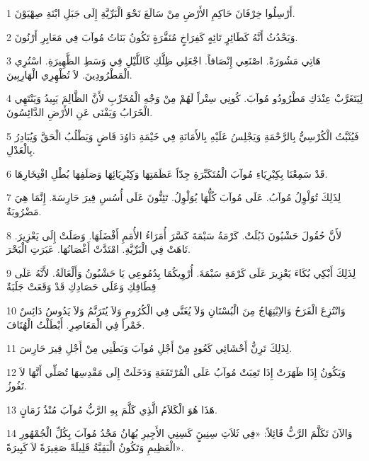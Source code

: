 \par 1 أَرْسِلُوا خِرْفَانَ حَاكِمِ الأَرْضِ مِنْ سَالَعَ نَحْوَ الْبَرِّيَّةِ إِلَى جَبَلِ ابْنَةِ صِهْيَوْنَ.
\par 2 وَيَحْدُثُ أَنَّهُ كَطَائِرٍ تَائِهٍ كَفِرَاخٍ مُنَفَّرَةٍ تَكُونُ بَنَاتُ مُوآبَ فِي مَعَابِرِ أَرْنُونَ.
\par 3 هَاتِي مَشُورَةً. اصْنَعِي إِنْصَافاً. اجْعَلِي ظِلَّكِ كَاللَّيْلِ فِي وَسَطِ الظَّهِيرَةِ. اسْتُرِي الْمَطْرُودِينَ. لاَ تُظْهِرِي الْهَارِبِينَ.
\par 4 لِيَتَغَرَّبْ عِنْدَكِ مَطْرُودُو مُوآبَ. كُونِي سِتْراً لَهُمْ مِنْ وَجْهِ الْمُخَرِّبِ لأَنَّ الظَّالِمَ يَبِيدُ وَيَنْتَهِي الْخَرَابُ وَيَفْنَى عَنِ الأَرْضِ الدَّائِسُونَ.
\par 5 فَيُثَبَّتُ الْكُرْسِيُّ بِالرَّحْمَةِ وَيَجْلِسُ عَلَيْهِ بِالأَمَانَةِ فِي خَيْمَةِ دَاوُدَ قَاضٍ وَيَطْلُبُ الْحَقَّ وَيُبَادِرُ بِالْعَدْلِ.
\par 6 قَدْ سَمِعْنَا بِكِبْرِيَاءِ مُوآبَ الْمُتَكَبِّرَةِ جِدّاً عَظَمَتِهَا وَكِبْرِيَائِهَا وَصَلَفِهَا بُطْلِ افْتِخَارِهَا.
\par 7 لِذَلِكَ تُوَلْوِلُ مُوآبُ. عَلَى مُوآبَ كُلُّهَا يُوَلْوِلُ. تَئِنُّونَ عَلَى أُسُسِ قِيرَ حَارِسَةَ. إِنَّمَا هِيَ مَضْرُوبَةٌ.
\par 8 لأَنَّ حُقُولَ حَشْبُونَ ذَبُلَتْ. كَرْمَةُ سَبْمَةَ كَسَّرَ أُمَرَاءُ الأُمَمِ أَفْضَلَهَا. وَصَلَتْ إِلَى يَعْزِيرَ. تَاهَتْ فِي الْبَرِّيَّةِ. امْتَدَّتْ أَغْصَانُهَا. عَبَرَتِ الْبَحْرَ.
\par 9 لِذَلِكَ أَبْكِي بُكَاءَ يَعْزِيرَ عَلَى كَرْمَةِ سَبْمَةَ. أُرْوِيكُمَا بِدُمُوعِي يَا حَشْبُونُ وَأَلْعَالَةُ. لأَنَّهُ عَلَى قِطَافِكِ وَعَلَى حَصَادِكِ قَدْ وَقَعَتْ جَلَبَةٌ
\par 10 وَانْتُزِعَ الْفَرَحُ وَالاِبْتِهَاجُ مِنَ الْبُسْتَانِ وَلاَ يُغَنَّى فِي الْكُرُومِ وَلاَ يُتَرَنَّمُ وَلاَ يَدُوسُ دَائِسٌ خَمْراً فِي الْمَعَاصِرِ. أَبْطَلْتُ الْهُتَافَ.
\par 11 لِذَلِكَ تَرِنُّ أَحْشَائِي كَعُودٍ مِنْ أَجْلِ مُوآبَ وَبَطْنِي مِنْ أَجْلِ قِيرَ حَارِسَ.
\par 12 وَيَكُونُ إِذَا ظَهَرَتْ إِذَا تَعِبَتْ مُوآبُ عَلَى الْمُرْتَفَعَةِ وَدَخَلَتْ إِلَى مَقْدِسِهَا تُصَلِّي أَنَّهَا لاَ تَفُوزُ.
\par 13 هَذَا هُوَ الْكَلاَمُ الَّذِي كَلَّمَ بِهِ الرَّبُّ مُوآبَ مُنْذُ زَمَانٍ.
\par 14 وَالآنَ تَكَلَّمَ الرَّبُّ قَائِلاً: «فِي ثَلاَثِ سِنِينٍَ كَسِنِي الأَجِيرِ يُهَانُ مَجْدُ مُوآبَ بِكُلِّ الْجُمْهُورِ الْعَظِيمِ وَتَكُونُ الْبَقِيَّةُ قَلِيلَةً صَغِيرَةً لاَ كَبِيرَةً».

